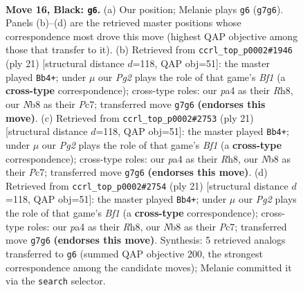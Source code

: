 \documentclass[11pt]{article}
\begin{document}
\clearpage

\begin{figure}[p]\centering
\begin{subfigure}{0.46\textwidth}\centering
\resizebox{\linewidth}{!}{%
\newchessgame
\chessboard[
  setfen={rn1qkb1r/p4ppp/b1p1p3/2PpP1PP/PP3P2/2P5/3N4/R1BQK1NR b KQq - 0 16},
  showmover=false,
  pgfstyle=straightmove, color=movearrow, markmove={g7-g6}
]}
\caption{}
\end{subfigure}\hfill
\begin{subfigure}{0.46\textwidth}\centering
\resizebox{\linewidth}{!}{%
\newchessgame
\chessboard[
  setfen={r2qkb1r/1pp2pp1/p1n1p1b1/3p2Pp/5P2/1P1PPN1P/PBP5/RN1QK2R b KQkq - 0 11},
  showmover=false,
  pgfstyle=straightmove, color=movearrow, markmove={f8-b4}
]}
\caption{}
\end{subfigure}
\\[4pt]
\begin{subfigure}{0.46\textwidth}\centering
\resizebox{\linewidth}{!}{%
\newchessgame
\chessboard[
  setfen={r2qkb1r/1pp2pp1/p1n1p1b1/3p2Pp/5P2/1P1PPN1P/PBP5/RN1QK2R b KQkq - 0 11},
  showmover=false,
  pgfstyle=straightmove, color=movearrow, markmove={f8-b4}
]}
\caption{}
\end{subfigure}\hfill
\begin{subfigure}{0.46\textwidth}\centering
\resizebox{\linewidth}{!}{%
\newchessgame
\chessboard[
  setfen={r2qkb1r/1pp2pp1/p1n1p1b1/3p2Pp/5P2/1P1PPN1P/PBP5/RN1QK2R b KQkq - 0 11},
  showmover=false,
  pgfstyle=straightmove, color=movearrow, markmove={f8-b4}
]}
\caption{}
\end{subfigure}
\caption{\textbf{Move 16, Black: \texttt{g6}.} (a) Our position; Melanie plays \texttt{g6} (\texttt{g7g6}). Panels (b)--(d) are the retrieved master positions whose correspondence most drove this move (highest QAP objective among those that transfer to it). (b) Retrieved from \texttt{ccrl\_top\_p0002\#1946} (ply 21) [structural distance $d$=118, QAP obj=51]: the master played \texttt{Bb4+}; under $\mu$ our \emph{Pg2} plays the role of that game's \emph{Bf1} (a \textbf{cross-type} correspondence); cross-type roles: our \emph{p}a4 as their \emph{R}h8, our \emph{N}b8 as their \emph{P}c7; transferred move \texttt{g7g6} \textbf{(endorses this move)}. (c) Retrieved from \texttt{ccrl\_top\_p0002\#2753} (ply 21) [structural distance $d$=118, QAP obj=51]: the master played \texttt{Bb4+}; under $\mu$ our \emph{Pg2} plays the role of that game's \emph{Bf1} (a \textbf{cross-type} correspondence); cross-type roles: our \emph{p}a4 as their \emph{R}h8, our \emph{N}b8 as their \emph{P}c7; transferred move \texttt{g7g6} \textbf{(endorses this move)}. (d) Retrieved from \texttt{ccrl\_top\_p0002\#2754} (ply 21) [structural distance $d$=118, QAP obj=51]: the master played \texttt{Bb4+}; under $\mu$ our \emph{Pg2} plays the role of that game's \emph{Bf1} (a \textbf{cross-type} correspondence); cross-type roles: our \emph{p}a4 as their \emph{R}h8, our \emph{N}b8 as their \emph{P}c7; transferred move \texttt{g7g6} \textbf{(endorses this move)}. Synthesis: 5 retrieved analogs transferred to \texttt{g6} (summed QAP objective 200, the strongest correspondence among the candidate moves); Melanie committed it via the \texttt{search} selector.}

\end{figure}
\end{document}
